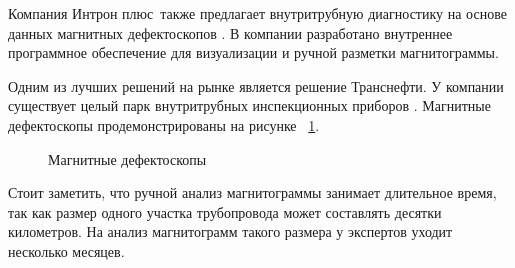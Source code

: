 \documentclass[a4paper,article,14pt]{extarticle}
\begin{document}
Компания \flqq Интрон плюс\frqq\, также предлагает внутритрубную диагностику на основе данных магнитных дефектоскопов \cite{s3}. 
В компании разработано внутреннее программное обеспечение для визуализации и ручной разметки магнитограммы. 

Одним из лучших решений на рынке является решение \flqq Транснефти\frqq. У компании существует целый парк внутритрубных инспекционных 
приборов \cite{s4}. 
Магнитные дефектоскопы продемонстрированы на рисунке ~\ref{image2}.

\begin{figure}[ht]
    \begin{center}
    
    \caption{
    \label{image2}
    Магнитные дефектоскопы}
    \end {center}
\end {figure}

Стоит заметить, что ручной анализ магнитограммы занимает длительное время, так как размер одного участка трубопровода 
может составлять десятки километров. На анализ магнитограмм такого размера у экспертов уходит несколько месяцев.
\end{document}
